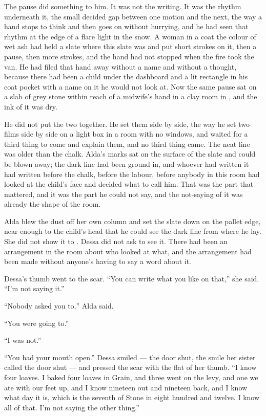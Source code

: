 The pause did something to him. It was not the writing. It was the rhythm underneath it, the small decided gap between one motion and the next, the way a hand stops to think and then goes on without hurrying, and he had seen that rhythm at the edge of a flare light in the snow. A woman in a coat the colour of wet ash had held a slate where this slate was and put short strokes on it, then a pause, then more strokes, and the hand had not stopped when the fire took the van. He had filed that hand away without a name and without a thought, because there had been a child under the dashboard and a lit rectangle in his coat pocket with a name on it he would not look at. Now the same pause sat on a slab of grey stone within reach of a midwife's hand in a clay room in , and the ink of it was dry.

He did not put the two together. He set them side by side, the way he set two films side by side on a light box in a room with no windows, and waited for a third thing to come and explain them, and no third thing came. The neat line was older than the chalk. Alda's marks sat on the surface of the slate and could be blown away; the dark line had been ground in, and whoever had written it had written before the chalk, before the labour, before anybody in this room had looked at the child's face and decided what to call him. That was the part that mattered, and it was the part he could not say, and the not-saying of it was already the shape of the room.

Alda blew the dust off her own column and set the slate down on the pallet edge, near enough to the child's head that he could see the dark line from where he lay. She did not show it to . Dessa did not ask to see it. There had been an arrangement in the room about who looked at what, and the arrangement had been made without anyone's having to say a word about it.

Dessa's thumb went to the scar. “You can write what you like on that,” she said. “I'm not saying it.”

“Nobody asked you to,” Alda said.

“You were going to.”

“I was not.”

“You had your mouth open.” Dessa smiled --- the door shut, the smile her sister called the door shut --- and pressed the scar with the flat of her thumb. “I know four loaves. I baked four loaves in Grain, and three went on the levy, and one we ate with our feet up, and I know nineteen out and nineteen back, and I know what day it is, which is the seventh of Stone in eight hundred and twelve. I know all of that. I'm not saying the other thing.”

